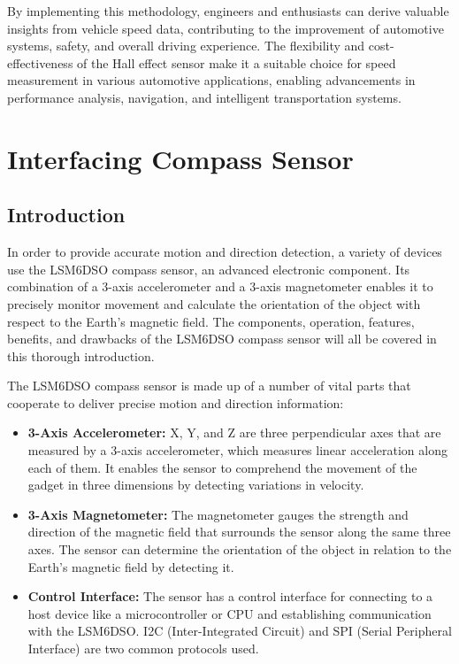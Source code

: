 \documentclass[
12pt,
oneside, 
onehalfspacing, 
nolistspacing, 
parskip, 
chapterinoneline, 
]{AASTCOMPUTER}
\begin{document}
By implementing this methodology, engineers and enthusiasts can derive valuable insights from vehicle speed data, contributing to the improvement of automotive systems, safety, and overall driving experience. The flexibility and cost-effectiveness of the Hall effect sensor make it a suitable choice for speed measurement in various automotive applications, enabling advancements in performance analysis, navigation, and intelligent transportation systems.

\section{Interfacing Compass Sensor}

\subsection{Introduction}
In order to provide accurate motion and direction detection, a variety of devices use the LSM6DSO compass sensor, an advanced electronic component. Its combination of a 3-axis accelerometer and a 3-axis magnetometer enables it to precisely monitor movement and calculate the orientation of the object with respect to the Earth's magnetic field. The components, operation, features, benefits, and drawbacks of the LSM6DSO compass sensor will all be covered in this thorough introduction.

The LSM6DSO compass sensor is made up of a number of vital parts that cooperate to deliver precise motion and direction information:

\begin{itemize}
  \item \textbf{3-Axis Accelerometer:} X, Y, and Z are three perpendicular axes that are measured by a 3-axis accelerometer, which measures linear acceleration along each of them. It enables the sensor to comprehend the movement of the gadget in three dimensions by detecting variations in velocity.
  \item \textbf{3-Axis Magnetometer:} The magnetometer gauges the strength and direction of the magnetic field that surrounds the sensor along the same three axes. The sensor can determine the orientation of the object in relation to the Earth's magnetic field by detecting it.
  \item \textbf{Control Interface:} The sensor has a control interface for connecting to a host device like a microcontroller or CPU and establishing communication with the LSM6DSO. I2C (Inter-Integrated Circuit) and SPI (Serial Peripheral Interface) are two common protocols used.
\end{itemize}
\end{document}
